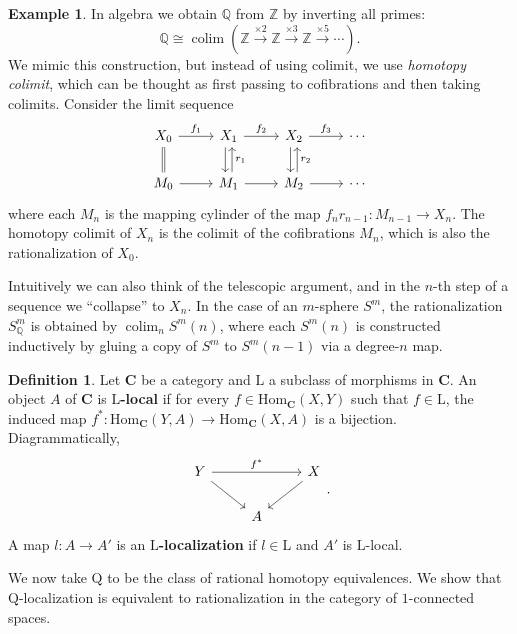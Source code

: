 \documentclass[psamsfonts]{amsart}
\theoremstyle{definition}
\newtheorem{defn}{Definition}[section]
\newtheorem{exmp}{Example}[section]
\newcommand{\Q}{\mathbb{Q}}
\newcommand{\Z}{\mathbb{Z}}
\newcommand{\Hom}{\mathrm{Hom}}
\DeclareMathOperator{\colim}{colim}
\numberwithin{equation}{section}
\begin{document}
\begin{exmp}

In algebra we obtain $\Q$ from $\Z$ by inverting all primes:
\[\Q\cong\colim\left(\Z\xrightarrow{\times2}\Z\xrightarrow{\times3}\Z\xrightarrow{\times5}\cdots\right).\]
We mimic this construction, but instead of using colimit, we use \textit{homotopy colimit}, which can be thought as first passing to cofibrations and then taking colimits. %
Consider the limit sequence
\[\begin{tikzcd}
X_0\arrow[d,equal]\arrow[r,"f_1"]&X_1\arrow[d,shift right]\arrow[r,"f_2"]&X_2\arrow[d,shift right]\arrow[r,"f_3"]&\cdots\\
M_0\arrow[r]&M_1\arrow[u,"r_1"',shift right]\arrow[r]&M_2\arrow[u,"r_2"',shift right]\arrow[r]&\cdots
\end{tikzcd}\]
where each $M_n$ is the mapping cylinder of the map $f_nr_{n-1}:M_{n-1}\to X_n$. The homotopy colimit of $X_n$ is the colimit of the cofibrations $M_n$, which is also the rationalization of $X_0$.

Intuitively we can also think of the telescopic argument, and in the $n$-th step of a sequence we ``collapse'' to $X_n$. In the case of an $m$-sphere $S^m$, the rationalization $S^m_\Q$ is obtained by $\colim_n{S^m(n)}$, where each $S^m(n)$ is constructed inductively by gluing a copy of $S^m$ to $S^m(n-1)$ via a degree-$n$ map.
\end{exmp}

\begin{defn}
Let $\mathbf{C}$ be a category and $\mathrm{L}$ a subclass of morphisms in $\mathbf{C}$. An object $A$ of $\mathbf{C}$ is \textbf{$\mathrm{L}$-local} if for every $f\in\Hom_\mathbf{C}(X,Y)$ such that $f\in\mathrm{L}$, the induced map $f^\ast:\Hom_\mathbf{C}(Y,A)\to\Hom_\mathbf{C}(X,A)$ is a bijection. Diagrammatically,
\[\begin{tikzcd}
Y\arrow[dr]\arrow[rr,"f^\ast"]&&X\arrow[dl]\\
&A
\end{tikzcd}.\]
A map $l:A\to A'$ is an \textbf{$\mathrm{L}$-localization} if $l\in\mathrm{L}$ and $A'$ is $\mathrm{L}$-local.
\end{defn}

We now take $\mathrm{Q}$ to be the class of rational homotopy equivalences. We show that $\mathrm{Q}$-localization is equivalent to rationalization in the category of $1$-connected spaces.
\end{document}
